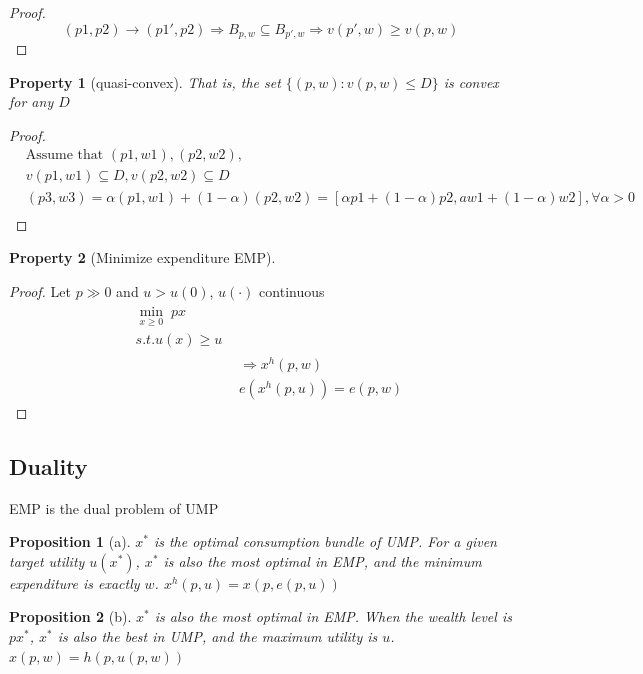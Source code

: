 \documentclass{article}
\newtheorem{proposition}{Proposition}
\newtheorem{property}{Property}
\begin{document}
\begin{proof}
$$(p1,p2)\rightarrow (p1',p2)\Rightarrow B_{p,w}\subseteq B_{p',w} \Rightarrow v(p',w)\ge v(p,w)$$
\end{proof}

\begin{property}[quasi-convex]
That is, the set $\{(p,w):v(p,w)\le D\}$ is convex for any $D$
\end{property}

\begin{proof}
\begin{align}
&\text{Assume that }(p1,w1),(p2,w2),
\\&v(p1,w1)\subseteq D,v(p2,w2)\subseteq D
\\&(p3,w3)=\alpha(p1,w1)+(1-\alpha)(p2,w2)=[\alpha p1+(1-\alpha)p2,aw1+(1-\alpha)w2],\forall \alpha>0
\\&
\end{align}
\end{proof}

\begin{property}[Minimize expenditure EMP]
\end{property}


\begin{proof}
Let $p\gg 0$ and $u>u(0)$, $u(\cdot)$ continuous
\begin{align}
\begin{split}
&\mathop{min}\limits_{x\ge0}\; px
\\&s.t. u(x)\ge u
\end{split}
\\&\Rightarrow  x^{h}(p,w)
\\&e(x^{h}(p,u))=e(p,w)
\end{align}
\end{proof}


\subsection{Duality}
EMP is the dual problem of UMP

\begin{proposition}[a]
$x^{*}$ is the optimal consumption bundle of UMP. For a given target utility $u(x^{*})$, $x^{*}$ is also the most optimal in EMP, and the minimum expenditure is exactly $w$. $x^{h}(p,u)=x(p,e(p,u))$
\end{proposition}

\begin{proposition}[b]
$x^{*}$ is also the most optimal in EMP. When the wealth level is $p x^{*}$, $x^{*}$ is also the best in UMP, and the maximum utility is $u$. $x(p,w)=h(p,u(p,w))$
\end{proposition}
\end{document}

